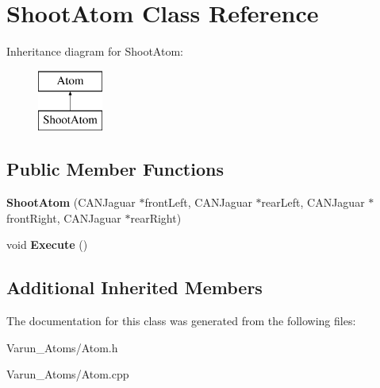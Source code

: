 \hypertarget{class_shoot_atom}{\section{Shoot\-Atom Class Reference}
\label{class_shoot_atom}
}
Inheritance diagram for Shoot\-Atom\-:\begin{figure}[H]
\begin{center}
\leavevmode
\includegraphics[height=2.000000cm]{class_shoot_atom}
\end{center}
\end{figure}
\subsection*{Public Member Functions}
\begin{DoxyCompactItemize}
\item 
\hypertarget{class_shoot_atom_a8eed14486140f0a16973244e78a6855e}{{\bfseries Shoot\-Atom} (C\-A\-N\-Jaguar $\ast$front\-Left, C\-A\-N\-Jaguar $\ast$rear\-Left, C\-A\-N\-Jaguar $\ast$front\-Right, C\-A\-N\-Jaguar $\ast$rear\-Right)}\label{class_shoot_atom_a8eed14486140f0a16973244e78a6855e}

\item 
\hypertarget{class_shoot_atom_a741db2f29645dd5521f94265b8d2fa73}{void {\bfseries Execute} ()}\label{class_shoot_atom_a741db2f29645dd5521f94265b8d2fa73}

\end{DoxyCompactItemize}
\subsection*{Additional Inherited Members}


The documentation for this class was generated from the following files\-:\begin{DoxyCompactItemize}
\item 
Varun\-\_\-\-Atoms/Atom.\-h\item 
Varun\-\_\-\-Atoms/Atom.\-cpp\end{DoxyCompactItemize}
